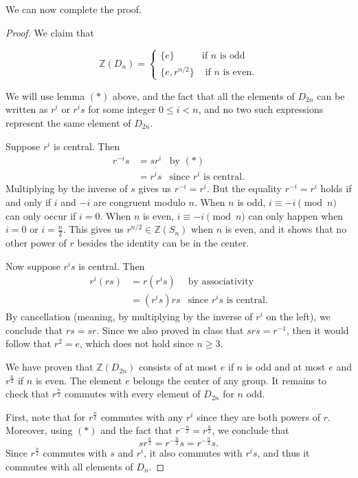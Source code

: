\documentclass[11pt]{article}
\newcommand{\Z}{\mathbb{Z}}
\theoremstyle{definition}
\begin{document}
We can now complete the proof.

\begin{proof}
We claim that

$$\Z(D_n) = \begin{cases}
	\{ e \} & \textrm{if $n$ is odd} \\
	 \{e, r^{n/2}\} & \textrm{ if $n$ is even}.
\end{cases}$$



We will use lemma $(*)$ above, and the fact that all the elements of $D_{2n}$ can be written as $r^i$ or $r^is$ for some integer $0\leqslant i<n$, and no two such expressions represent the same element of $D_{2n}$.

Suppose $r^i$ is central. Then
$$\begin{aligned}
	r^{-i}s & = sr^i & \textrm{by } (*) \\ 
	& = r^i s & \textrm{since $r^i$ is central}.
\end{aligned}$$
Multiplying by the inverse of $s$ gives us $r^{-i} = r^i$.
But the equality $r^{-i} = r^i$ holds if and only if $i$ and $-i$ are congruent modulo $n$. When $n$ is odd, $i \equiv -i \!\pmod n$ can only occur if $i = 0$. When $n$ is even, $i \equiv -i \!\pmod n$ can only happen when $i = 0$ or $i = \frac{n}{2}$. This gives us $r^{n/2} \in \Z(S_n)$ when $n$ is even, and it shows that no other power of $r$ besides the identity can be in the center.

Now suppose $r^is$ is central. Then 
$$\begin{aligned}
	r^{i}(rs) & = r(r^is) & \textrm{by associativity}\\ 
	& = (r^is)r s & \textrm{since $r^is$ is central}.
\end{aligned}$$
By cancellation (meaning, by multiplying by the inverse of $r^i$ on the left), we conclude that $rs=sr$. Since we also proved in class that $srs=r^{-1}$, then it would follow that $r^2 = e$, which does not hold since $n \geqslant 3$. 

We have proven that $\Z(D_{2n})$ consists of at most $e$ if $n$ is odd and at most $e$ and $r^{\frac{n}{2}}$ if $n$ is even. The element $e$ belongs the center of any group. It remains to check that $r^{\frac{n}{2}}$ commutes with every element of $D_{2n}$ for $n$ odd.

First, note that for $r^{\frac{n}{2}}$ commutes with any $r^i$ since they are both powers of $r$. Moreover, using $(*)$ and the fact that $r^{-\frac{n}{2}} = r^{\frac{n}{2}}$, we conclude that
$$sr^{\frac{n}{2}} = r^{-\frac{n}{2}}s = r^{-\frac{n}{2}}s.$$
Since $r^{\frac{n}{2}}$ commutes with $s$ and $r^i$, it also commutes with $r^is$, and thus it commutes with all elements of $D_n$.
\end{proof}
\end{document}
